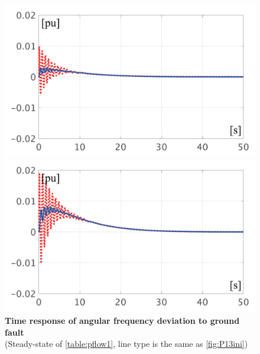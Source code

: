 \documentclass[graybox, envcountchap]{svmult}
\begin{document}
\begin{figure}[t]
  \centering
  {
  \begin{minipage}{0.49\linewidth}
    \centering
    \includegraphics[width = 1.0\linewidth]{figs/50mP1}
  \end{minipage}
  \begin{minipage}{0.49\linewidth}
    \centering
    \includegraphics[width = 1.0\linewidth]{figs/100mP1}
  \end{minipage}
  \medskip
  \caption{\textbf{Time response of angular frequency deviation to ground fault}
  \\ \centering (Steady-state of \ref{table:pflow1}, line type is the same as \ref{fig:P13ini})}
  \label{fig:P1fault}
  }
\medskip
\end{figure}
\end{document}
